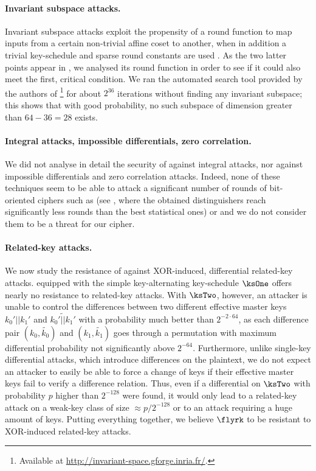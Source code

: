 \paragraph{Invariant subspace attacks.}
Invariant subspace attacks exploit the propensity of a round function to map inputs from a certain non-trivial affine coset to another, when in addition a trivial key-schedule and sparse round constants are used \cite{briceinv}.
As the two latter points appear in \fly, we analysed its round function in order to see if it could also meet the first, critical condition.
We ran the automated search tool provided by the authors of \cite{briceinv}\footnote{Available at \url{http://invariant-space.gforge.inria.fr/}.}
for about $2^{36}$ iterations without finding any invariant subspace; this shows that with good probability, no such subspace of dimension greater than $64 - 36 = 28$ exists.

\paragraph{Integral attacks, impossible differentials, zero correlation.}
We did not analyse in detail the security of \fly against integral attacks, nor against impossible differentials and zero correlation
attacks. Indeed, none of these techniques seem to be able to attack a significant number of rounds of bit-oriented ciphers such as \present
(see \eg \cite{bitintegral,presentzero,newdivision}, where the obtained distinguishers reach significantly less rounds than the best statistical ones)
or \fly and we do not consider them to be a threat
for our cipher.

\paragraph{Related-key attacks.}
We now study the resistance of \fly against XOR-induced, differential related-key attacks.
\fly equipped with the simple key-alternating key-schedule $\ksOne$ offers nearly no resistance to related-key attacks. With $\ksTwo$, however, an attacker is unable to control the
differences between two different effective master keys $k_0'||k_1'$ and $\widetilde{k_0'||k_1'}$ with a probability much better than $2^{-2\cdot64}$, as each difference pair $(k_0,\widetilde{k_0})$
and $(k_1,\widetilde{k_1})$ goes through a permutation with maximum differential probability not significantly
above $2^{-64}$. Furthermore, unlike single-key differential attacks, which introduce differences
on the plaintext, we do not expect an attacker to easily be able to force a change of keys
if their effective master keys fail to verify a difference relation. Thus, even
if a differential on $\ksTwo$ with probability $p$ higher than $2^{-128}$ were found, it would only lead to a related-key attack on a weak-key class
of size $\approx p/2^{-128}$ or to an attack requiring a huge amount of keys.
Putting everything together, we believe $\flyrk$ to be resistant to XOR-induced related-key attacks.

